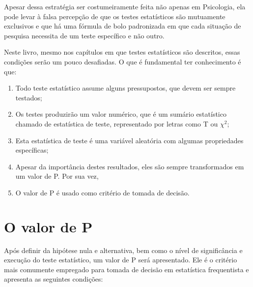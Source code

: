 \documentclass[
]{book}
\providecommand{\tightlist}{%
  \setlength{\itemsep}{0pt}\setlength{\parskip}{0pt}}
\begin{document}
Apesar dessa estratégia ser costumeiramente feita não apenas em Psicologia, ela pode levar à falsa percepção de que os testes estatísticos são mutuamente exclusivos e que há uma fórmula de bolo padronizada em que cada situação de pesquisa necessita de um teste específico e não outro.

Neste livro, mesmo nos capítulos em que testes estatísticos são descritos, essas condições serão um pouco desafiadas. O que é fundamental ter conhecimento é que:

\begin{enumerate}
\def\labelenumi{(\arabic{enumi})}
\tightlist
\item
  Todo teste estatístico assume alguns pressupostos, que devem ser sempre testados;\\
\item
  Os testes produzirão um valor numérico, que é um sumário estatístico chamado de estatística de teste, representado por letras como T ou \(\chi^2\);\\
\item
  Esta estatística de teste é uma variável aleatória com algumas propriedades específicas;\\
\item
  Apesar da importância destes resultados, eles são sempre transformados em um valor de P. Por sua vez,\\
\item
  O valor de P é usado como critério de tomada de decisão.
\end{enumerate}

\hypertarget{o-valor-de-p}{%
\section{O valor de P}\label{o-valor-de-p}}

Após definir da hipótese nula e alternativa, bem como o nível de significância e execução do teste estatístico, um valor de P será apresentado. Ele é o critério mais comumente empregado para tomada de decisão em estatística frequentista e apresenta as seguintes condições:
\end{document}
